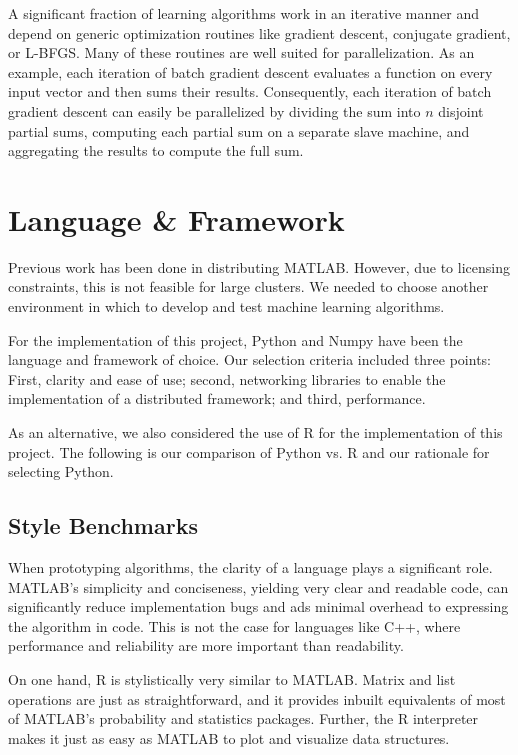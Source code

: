 \documentclass[%
  final,
  notitlepage,
  narroweqnarray,
  inline,
]{ieee}
\begin{document}
A significant fraction of learning algorithms work in an iterative manner and
depend on generic optimization routines like gradient descent, conjugate
gradient, or L-BFGS. Many of these routines are well suited for parallelization.
As an example, each iteration of batch gradient descent evaluates a function on
every input vector and then sums their results. Consequently, each iteration of
batch gradient descent can easily be parallelized by dividing the sum into $n$
disjoint partial sums, computing each partial sum on a separate slave machine,
and aggregating the results to compute the full sum.

\section{Language \& Framework}

Previous work has been done in distributing MATLAB. However, due to licensing
constraints, this is not feasible for large clusters. We needed to choose
another environment in which to develop and test machine learning
algorithms.

For the implementation of this project, Python and Numpy have been the language
and framework of choice. Our selection criteria included three points: First,
clarity and ease of use; second, networking libraries to enable the
implementation of a distributed framework; and third, performance.

As an alternative, we also considered the use of R for the implementation of
this project. The following is our comparison of Python vs. R and our rationale
for selecting Python.

\subsection{Style Benchmarks}

When prototyping algorithms, the clarity of a language plays a significant role.
MATLAB's simplicity and conciseness, yielding very clear and readable code, can
significantly reduce implementation bugs and ads minimal overhead to expressing
the algorithm in code. This is not the case for languages like C++, where
performance and reliability are more important than readability.

On one hand, R is stylistically very similar to MATLAB. Matrix and list
operations are just as straightforward, and it provides inbuilt equivalents of
most of MATLAB's probability and statistics packages. Further, the R interpreter
makes it just as easy as MATLAB to plot and visualize data structures.
\end{document}
